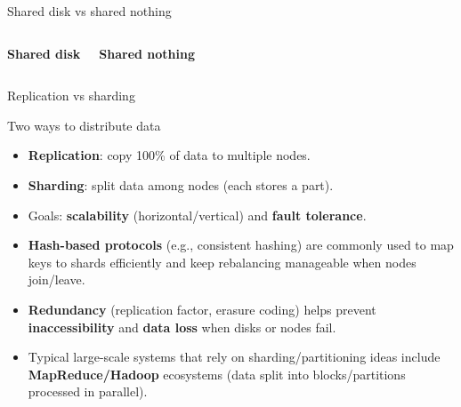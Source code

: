 \documentclass[10pt,aspectratio=169]{beamer}
\begin{document}
\begin{frame}{Shared disk vs shared nothing}
\begin{columns}[T,onlytextwidth]
\centering
\textbf{Shared disk}\\[0.3em]

\centering
\textbf{Shared nothing}\\[0.3em]
\end{columns}
\end{frame}


\begin{frame}{Replication vs sharding}
\begin{block}{Two ways to distribute data}
\begin{itemize}
  \item \textbf{Replication}: copy 100\% of data to multiple nodes.
  \item \textbf{Sharding}: split data among nodes (each stores a part).
\end{itemize}
\end{block}

\begin{itemize}
  \item Goals: \textbf{scalability} (horizontal/vertical) and \textbf{fault tolerance}.
  \item \textbf{Hash-based protocols} (e.g., consistent hashing) are commonly used to
  map keys to shards efficiently and keep rebalancing manageable when nodes join/leave.
  \item \textbf{Redundancy} (replication factor, erasure coding) helps prevent
  \textbf{inaccessibility} and \textbf{data loss} when disks or nodes fail.
  \item Typical large-scale systems that rely on sharding/partitioning ideas include
  \textbf{MapReduce/Hadoop} ecosystems (data split into blocks/partitions processed in parallel).
\end{itemize}
\end{frame}
\end{document}
